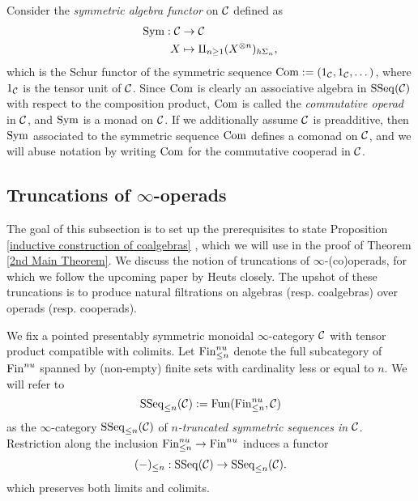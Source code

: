 \begin{example}
\label{Symmetric algebra}
	Consider the \emph{symmetric algebra functor} on ${\mathcal{C}}$ defined as 
	\begin{align*}
		\operatorname{Sym}:{\mathcal{C}} & \to  {\mathcal{C}}\\
		X & \mapsto \amalg_{n\geq 1} (X^{\otimes n})_{h\Sigma_n},
	\end{align*}
	which is the Schur functor of the symmetric sequence $\operatorname{Com}:=(1_{\mathcal{C}},1_{\mathcal{C}},\dots)$, where $1_{\mathcal{C}}$ is the tensor unit of ${\mathcal{C}}$.
	Since $\operatorname{Com}$ is clearly an associative algebra in $\operatorname{SSeq}({\mathcal{C}})$ with respect to the 
	composition product, $\operatorname{Com}$ is called the \emph{commutative operad} in ${\mathcal{C}}$, and
	$\operatorname{Sym}$ is a monad on ${\mathcal{C}}$.
	If we additionally assume ${\mathcal{C}}$ is preadditive, then $\operatorname{Sym}$ associated to the symmetric sequence $\operatorname{Com}$ defines a comonad on ${\mathcal{C}}$, and we will abuse notation by writing $\operatorname{Com}$ for the commutative cooperad in ${\mathcal{C}}$.
\end{example}


\subsection{Truncations of $\infty$-operads}
The goal of this subsection is to set up the prerequisites to state Proposition \ref{inductive construction of coalgebras}  \cite[Theorem 4.12]{Heuts_Koszul}, which we will use in the proof of Theorem \ref{2nd Main Theorem}. 
We discuss the notion of truncations of $\infty$-(co)operads, for which we follow the upcoming paper by Heuts \cite{Heuts_Koszul} closely. The upshot of these truncations is to produce natural filtrations on algebras (resp. coalgebras) over operads (resp. cooperads). 


We fix a pointed presentably symmetric monoidal $\infty$-category ${\mathcal{C}}$ with tensor product compatible with colimits.
Let $\operatorname{Fin}^{nu}_{\leq n}$ denote the full subcategory of $\operatorname{Fin}^{nu}$ spanned by (non-empty) finite sets with cardinality less or equal to $n$.
We will refer to
$$
\operatorname{SSeq}_{\leq n}({\mathcal{C}}):=\operatorname{Fun}(\operatorname{Fin}^{nu}_{\leq n}, {\mathcal{C}})
$$ 
as the $\infty$-category $\operatorname{SSeq}_{\leq n}({\mathcal{C}})$ of \emph{$n$-truncated symmetric sequences in ${\mathcal{C}}$}.
Restriction along the inclusion $\operatorname{Fin}^{nu}_{\leq n}\to \operatorname{Fin}^{nu}$ induces a
functor 
$$
(-)_{\leq n}: \operatorname{SSeq}({\mathcal{C}}) \to 
\operatorname{SSeq}_{\leq n}({\mathcal{C}}).
$$
which preserves both limits and colimits. 

